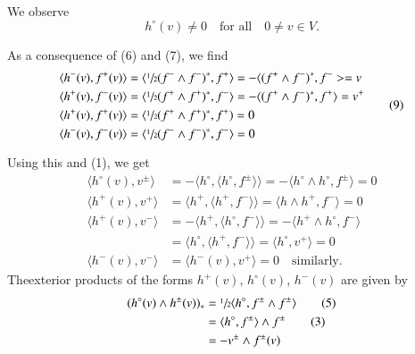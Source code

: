 We observe
\begin{equation*}
h^{\circ}(v)\neq 0\quad\text{for all}\quad 0\neq v\in V.\tag{8}
\end{equation*}

As a consequence of (6) and (7), we find
\begin{equation*}
\begin{split}
& \langle h^{-}(v),f^{+}(v)\rangle =\langle\sfrac{1}{2}(f^{-}\wedge
f^{-})^{*},f^{+}\rangle=-\langle (f^{+}\wedge f^{-})^{*},f^{-}>=v\\
& \langle h^{+}(v),f^{-}(v)\rangle =\langle \sfrac{1}{2}(f^{+}\wedge
f^{+})^{*},f^{-}\rangle =-\langle (f^{+}\wedge f^{-})^{*},f^{+}\rangle
=v^{+}\\
& \langle h^{+}(v),f^{+}(v)\rangle =\langle \sfrac{1}{2}(f^{+}\wedge f^{+})^{*},f^{+})=0\\
& \langle h^{-}(v),f^{-}(v)\rangle =\langle \sfrac{1}{2}(f^{-}\wedge
f^{-})^{*},f^{-}\rangle =0
\end{split}\tag{9}
\end{equation*}

Using this and (1), we get
\begin{equation*}
\begin{split}
\langle h^{\circ}(v),v^{\pm}\rangle &= -\langle h^{\circ},\langle
h^{\circ},f^{\pm}\rangle\rangle =-\langle h^{\circ}\wedge
h^{\circ},f^{\pm}\rangle=0\\
\langle h^{+}(v),v^{+}\rangle &= \langle h^{+},\langle
h^{+},f^{-}\rangle\rangle=\langle h\wedge h^{+},f^{-}\rangle =0\\
\langle h^{+}(v),v^{-}\rangle &= -\langle h^{+},\langle
h^{\circ},f^{-}\rangle\rangle=-\langle h^{+}\wedge
h^{\circ},f^{-}\rangle\\
&= \langle h^{\circ},\langle h^{+},f^{-}\rangle\rangle=\langle
h^{\circ},v^{+}\rangle=0\\
\langle h^{-}(v),v^{-}\rangle &= \langle
h^{-}(v),v^{+}\rangle=0\quad\text{similarly.}  
\end{split}
\tag{10}
\end{equation*}
The\pageoriginale exterior products of the forms $h^{+}(v)$,
$h^{\circ}(v)$, $h^{-}(v)$ are given by
\begin{align*}
(h^{\circ}(v)\wedge h^{\pm}(v))_{*} &= \sfrac{1}{2}\langle
h^{\circ},f^{\pm}\wedge f^{\pm}\rangle\tag{5}\\
&= \langle h^{\circ},f^{\pm}\rangle\wedge f^{\pm}\tag{3}\\
&= -v^{\pm}\wedge f^{\pm}(v)
\end{align*}


